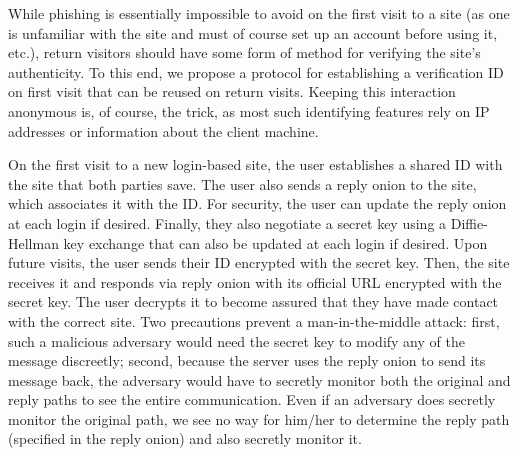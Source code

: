 \documentclass[12pt]{article}
\begin{document}
While phishing is essentially impossible to avoid on the first visit to a site (as one is unfamiliar with the site and must of course set up an account before using it, etc.), return visitors should have some form of method for verifying the site's authenticity. To this end, we propose a protocol for establishing a verification ID on first visit that can be reused on return visits. Keeping this interaction anonymous is, of course, the trick, as most such identifying features rely on IP addresses or information about the client machine.

On the first visit to a new login-based site, the user establishes a shared ID with the site that both parties save. The user also sends a reply onion to the site, which associates it with the ID. For security, the user can update the reply onion at each login if desired. Finally, they also negotiate a secret key using a Diffie-Hellman key exchange that can also be updated at each login if desired. Upon future visits, the user sends their ID encrypted with the secret key. Then, the site receives it and responds via reply onion with its official URL encrypted with the secret key. The user decrypts it to become assured that they have made contact with the correct site. Two precautions prevent a man-in-the-middle attack: first, such a malicious adversary would need the secret key to modify any of the message discreetly; second, because the server uses the reply onion to send its message back, the adversary would have to secretly monitor both the original and reply paths to see the entire communication. Even if an adversary does secretly monitor the original path, we see no way for him/her to determine the reply path (specified in the reply onion) and also secretly monitor it.
\end{document}
